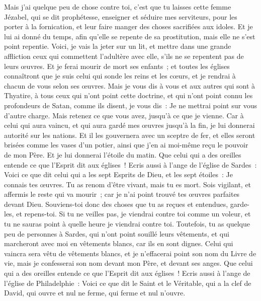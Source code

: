 \begin{multicols}{2}
Mais j'ai quelque peu de chose contre toi, c'est que tu laisses cette femme Jézabel, qui se dit prophétesse, enseigner et séduire mes serviteurs, pour les porter à la fornication, et leur faire manger des choses sacrifiées aux idoles.
Et je lui ai donné du temps, afin qu'elle se repente de sa prostitution, mais elle ne s'est point repentie.
Voici, je vais la jeter sur un lit, et mettre dans une grande affliction ceux qui commettent l'adultère avec elle, s'ils ne se repentent pas de leurs œuvres.
Et je ferai mourir de mort ses enfants~; et toutes les églises connaîtront que je suis celui qui sonde les reins et les cœurs, et je rendrai à chacun de vous selon ses œuvres.
Mais je vous dis à vous et aux autres qui sont à Thyatire, à tous ceux qui n'ont point cette doctrine, et qui n'ont point connu les profondeurs de Satan, comme ils disent, je vous dis~: Je ne mettrai point sur vous d'autre charge.
Mais retenez ce que vous avez, jusqu'à ce que je vienne.
Car à celui qui aura vaincu, et qui aura gardé mes œuvres jusqu'à la fin, je lui donnerai autorité sur les nations.
Et il les gouvernera avec un sceptre de fer, et elles seront brisées comme les vases d'un potier, ainsi que j'en ai moi-même reçu le pouvoir de mon Père.
Et je lui donnerai l'étoile du matin.
Que celui qui a des oreilles entende ce que l'Esprit dit aux églises~!
\VerseOne{}Ecris aussi à l'ange de l'église de Sardes~: Voici ce que dit celui qui a les sept Esprits de Dieu, et les sept étoiles~: Je connais tes œuvres. Tu as renom d'être vivant, mais tu es mort.
Sois vigilant, et affermis le reste qui va mourir~; car je n'ai point trouvé tes œuvres parfaites devant Dieu.
Souviens-toi donc des choses que tu as reçues et entendues, garde-les, et repens-toi. Si tu ne veilles pas, je viendrai contre toi comme un voleur, et tu ne sauras point à quelle heure je viendrai contre toi.
Toutefois, tu as quelque peu de personnes à Sardes, qui n'ont point souillé leurs vêtements, et qui marcheront avec moi en vêtements blancs, car ils en sont dignes.
Celui qui vaincra sera vêtu de vêtements blancs, et je n'effacerai point son nom du Livre de vie, mais je confesserai son nom devant mon Père, et devant ses anges.
Que celui qui a des oreilles entende ce que l'Esprit dit aux églises~!
Ecris aussi à l'ange de l'église de Philadelphie~: Voici ce que dit le Saint et le Véritable, qui a la clef de David, qui ouvre et nul ne ferme, qui ferme et nul n'ouvre.

\end{multicols}
